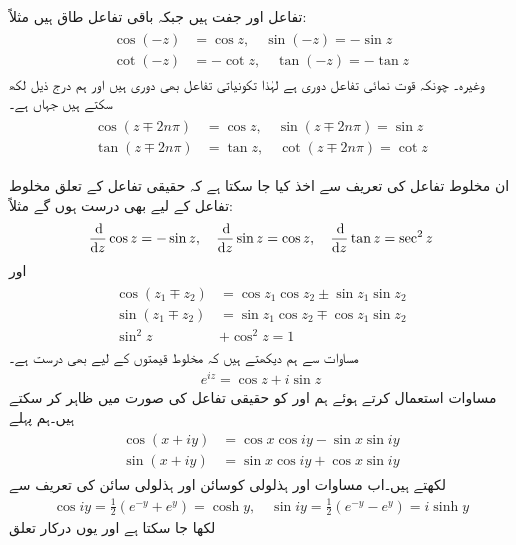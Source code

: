تفاعل  اور   جفت ہیں جبکہ باقی تفاعل طاق ہیں مثلاً:
\begin{gather}
\begin{aligned}\label{مساوات_مخلوط_ہذلولی_تعریف_ت}
\cos (-z)&=\cos z,\quad \sin (-z)=-\sin z\\
\cot(-z)&=-\cot z,\quad \tan(-z)=-\tan z
\end{aligned}
\end{gather}
وغیرہ۔ چونکہ قوت نمائی تفاعل دوری ہے لہٰذا تکونیاتی تفاعل بھی دوری ہیں اور ہم درج ذیل لکھ سکتے ہیں جہاں  ہے۔
\begin{gather}
\begin{aligned}\label{مساوات_مخلوط_ہذلولی_تعریف_ٹ}
\cos(z\mp2n\pi)&=\cos z,\quad \sin(z\mp2n\pi)=\sin z\\
\tan(z\mp2n\pi)&=\tan z,\quad \cot (z\mp2n\pi)=\cot z
\end{aligned}
\end{gather}

ان مخلوط تفاعل کی تعریف سے اخذ کیا جا سکتا ہے کہ حقیقی تفاعل کے تعلق مخلوط تفاعل کے لیے  بھی درست ہوں گے مثلاً:
\begin{align}\label{مساوات_مخلوط_ہذلولی_تعریف_ث}
\frac{\dif}{\dif z}\cos z=-\sin z,\quad \frac{\dif}{\dif z}\sin z=\cos z,\quad \frac{\dif}{\dif z}\tan z=\sec^2 z
\end{align}
اور
\begin{gather}
\begin{aligned}\label{مساوات_مخلوط_ہذلولی_تعریف_ج}
\cos(z_1\mp z_2)&=\cos z_1\cos z_2\pm \sin z_1\sin z_2\\
\sin(z_1\mp z_2)&=\sin z_1\cos z_2\mp \cos z_1\sin z_2\\
\sin^2 z &+\cos^2 z=1 
\end{aligned}
\end{gather}
مساوات  سے ہم دیکھتے ہیں کہ  مخلوط قیمتوں کے لیے بھی درست ہے۔
\begin{align}\label{مساوات_مخلوط_ہذلولی_تعریف_چ}
e^{iz}=\cos z+i\sin z
\end{align}
مساوات  استعمال کرتے ہوئے ہم  اور  کو حقیقی تفاعل کی صورت میں ظاہر کر سکتے ہیں۔ہم پہلے
\begin{gather}
\begin{aligned}\label{مساوات_مخلوط_ہذلولی_تعریف_ح}
\cos(x+iy)&=\cos x\cos iy-\sin x\sin iy\\
\sin(x+iy)&=\sin x\cos iy+\cos x\sin iy
\end{aligned}
\end{gather}
لکھتے ہیں۔اب مساوات  اور ہذلولی کوسائن اور ہذلولی سائن کی تعریف سے
\begin{align*}
\cos iy=\frac{1}{2}(e^{-y}+e^{y})=\cosh y,\quad \sin iy=\frac{1}{2}(e^{-y}-e^{y})=i\sinh y
\end{align*}
لکھا جا سکتا ہے اور یوں درکار تعلق 

